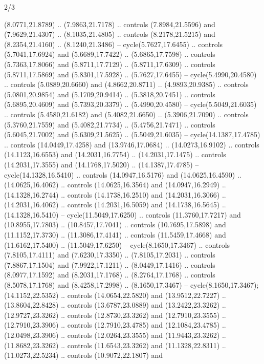\begin{flagdescription}{2/3}
\begin{scope}[yshift=\flagwidth,scale=\flagwidth/1241.93737]
\begin{scope}[y=-1mm, x=1mm,draw=gold,fill=blue,line join=miter,miter limit=4,line width=1.8\lw]
{  (8.0771,21.8789) .. (7.9863,21.7178) .. controls (7.8984,21.5596) and
  (7.9629,21.4307) .. (8.1035,21.4805) .. controls (8.2178,21.5215) and
  (8.2354,21.4160) .. (8.1240,21.3486) -- cycle(5.7627,17.6455) .. controls
  (5.7041,17.6924) and (5.6689,17.7422) .. (5.6865,17.7598) .. controls
  (5.7363,17.8066) and (5.8711,17.7129) .. (5.8711,17.6309) .. controls
  (5.8711,17.5869) and (5.8301,17.5928) .. (5.7627,17.6455) --
  cycle(5.4990,20.4580) .. controls (5.0889,20.6660) and (4.8662,20.8711) ..
  (4.9893,20.9385) .. controls (5.0801,20.9854) and (5.1709,20.9414) ..
  (5.3818,20.7451) .. controls (5.6895,20.4609) and (5.7393,20.3379) ..
  (5.4990,20.4580) -- cycle(5.5049,21.6035) .. controls (5.4580,21.6182) and
  (5.4082,21.6650) .. (5.3906,21.7090) .. controls (5.3760,21.7559) and
  (5.4082,21.7734) .. (5.4756,21.7471) .. controls (5.6045,21.7002) and
  (5.6309,21.5625) .. (5.5049,21.6035) -- cycle(14.1387,17.4785) .. controls
  (14.0449,17.4258) and (13.9746,17.0684) .. (14.0273,16.9102) .. controls
  (14.1123,16.6553) and (14.2031,16.7754) .. (14.2031,17.1475) .. controls
  (14.2031,17.3555) and (14.1768,17.5020) .. (14.1387,17.4785) --
  cycle(14.1328,16.5410) .. controls (14.0947,16.5176) and (14.0625,16.4590) ..
  (14.0625,16.4062) .. controls (14.0625,16.3564) and (14.0947,16.2949) ..
  (14.1328,16.2744) .. controls (14.1738,16.2510) and (14.2031,16.3066) ..
  (14.2031,16.4062) .. controls (14.2031,16.5059) and (14.1738,16.5645) ..
  (14.1328,16.5410) -- cycle(11.5049,17.6250) .. controls (11.3760,17.7217) and
  (10.8955,17.7803) .. (10.8457,17.7041) .. controls (10.7695,17.5898) and
  (11.1152,17.3730) .. (11.3086,17.4141) .. controls (11.5459,17.4668) and
  (11.6162,17.5400) .. (11.5049,17.6250) -- cycle(8.1650,17.3467) .. controls
  (7.8105,17.4111) and (7.6230,17.3350) .. (7.8105,17.2031) .. controls
  (7.8867,17.1504) and (7.9922,17.1211) .. (8.0449,17.1416) .. controls
  (8.0977,17.1592) and (8.2031,17.1768) .. (8.2764,17.1768) .. controls
  (8.5078,17.1768) and (8.4258,17.2998) .. (8.1650,17.3467) --
  cycle(8.1650,17.3467);
 (14.1152,22.5352) .. controls (14.0654,22.5820)
  and (13.9512,22.7227) .. (13.8604,22.8428) .. controls (13.6787,23.0889) and
  (13.2422,23.3262) .. (12.9727,23.3262) .. controls (12.8730,23.3262) and
  (12.7910,23.3555) .. (12.7910,23.3906) .. controls (12.7910,23.4785) and
  (12.1084,23.4785) .. (12.0498,23.3906) .. controls (12.0264,23.3555) and
  (11.9443,23.3262) .. (11.8682,23.3262) .. controls (11.6543,23.3262) and
  (11.1328,22.8311) .. (11.0273,22.5234) .. controls (10.9072,22.1807) and
}
\end{scope}
\end{scope}
\end{flagdescription}
